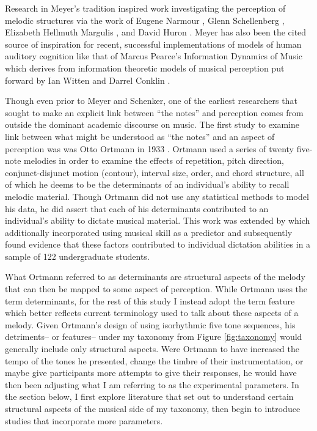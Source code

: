 \documentclass[]{book}
\begin{document}
Research in Meyer's tradition inspired work investigating the perception of melodic structures via the work of Eugene Narmour \citep{narmourAnalysisCognitionBasic1990, narmourAnalysisCognitionMelodic1992}, Glenn Schellenberg \citep{schellenbergSimplifyingImplicationRealizationModel1997}, Elizabeth Hellmuth Margulis \citep{margulisModelMelodicExpectation2005}, and David Huron \citep{huronSweetAnticipation2006}.
Meyer has also been the cited source of inspiration for recent, successful implementations of models of human auditory cognition like that of Marcus Pearce's Information Dynamics of Music \citep{pearceConstructionEvaluationStatistical2005, pearceStatisticalLearningProbabilistic2018a} which derives from information theoretic models of musical perception put forward by Ian Witten and Darrel Conklin \citep{conklinMultipleViewpointSystems1995}.

Though even prior to Meyer and Schenker, one of the earliest researchers that sought to make an explicit link between ``the notes'' and perception comes from outside the dominant academic discourse on music.
The first study to examine link between what might be understood as ``the notes'' and an aspect of perception was was Otto Ortmann in 1933 \citep{ortmannTonalDeterminantsMelodic1933}.
Ortmann used a series of twenty five-note melodies in order to examine the effects of repetition, pitch direction, conjunct-disjunct motion (contour), interval size, order, and chord structure, all of which he deems to be the determinants of an individual's ability to recall melodic material.
Though Ortmann did not use any statistical methods to model his data, he did assert that each of his determinants contributed to an individual's ability to dictate musical material.
This work was extended by \citet{taylorStrategiesMemoryShort1983} which additionally incorporated using musical skill as a predictor and subsequently found evidence that these factors contributed to individual dictation abilities in a sample of 122 undergraduate students.

What Ortmann referred to as determinants are structural aspects of the melody that can then be mapped to some aspect of perception.
While Ortmann uses the term determinants, for the rest of this study I instead adopt the term feature which better reflects current terminology used to talk about these aspects of a melody.
Given Ortmann's design of using isorhythmic five tone sequences, his detriments-- or features-- under my taxonomy from Figure \ref{fig:taxonomy} would generally include only structural aspects.
Were Ortmann to have increased the tempo of the tones he presented, change the timbre of their instrumentation, or maybe give participants more attempts to give their responses, he would have then been adjusting what I am referring to as the experimental parameters.
In the section below, I first explore literature that set out to understand certain structural aspects of the musical side of my taxonomy, then begin to introduce studies that incorporate more parameters.
\end{document}
